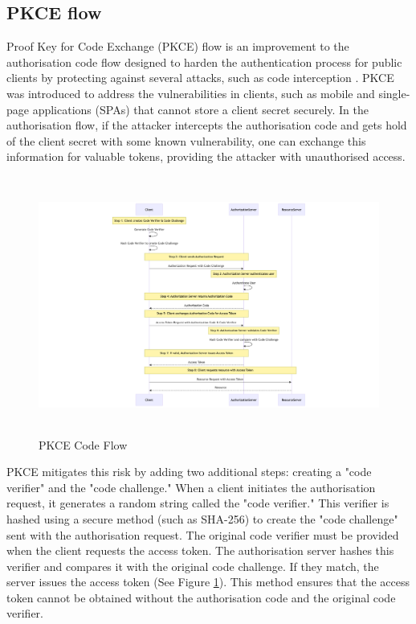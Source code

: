 \newpage
\subsection{PKCE flow}
\label{sec:pkce_flow}
Proof Key for Code Exchange (PKCE) flow is an improvement to the authorisation code flow designed to harden the authentication process for public clients by protecting against several attacks, such as code interception \citep{pkce}. PKCE was introduced to address the vulnerabilities in clients, such as mobile and single-page applications (SPAs) that cannot store a client secret securely. In the authorisation flow, if the attacker intercepts the authorisation code and gets hold of the client secret with some known vulnerability, one can exchange this information for valuable tokens, providing the attacker with unauthorised access. 


\begin{figure}[h!]
\centering
\caption{PKCE Code Flow}\label{fig:pkce_flow}
\includegraphics[width=\textwidth, height=320px]{pics/pkce.png}
\end{figure}

PKCE mitigates this risk by adding two additional steps: creating a "code verifier" and the "code challenge." When a client initiates the authorisation request, it generates a random string called the "code verifier." This verifier is hashed using a secure method (such as SHA-256) to create the "code challenge" sent with the authorisation request. The original code verifier must be provided when the client requests the access token. The authorisation server hashes this verifier and compares it with the original code challenge. If they match, the server issues the access token (See Figure \ref{fig:pkce_flow}). This method ensures that the access token cannot be obtained without the authorisation code and the original code verifier. 

